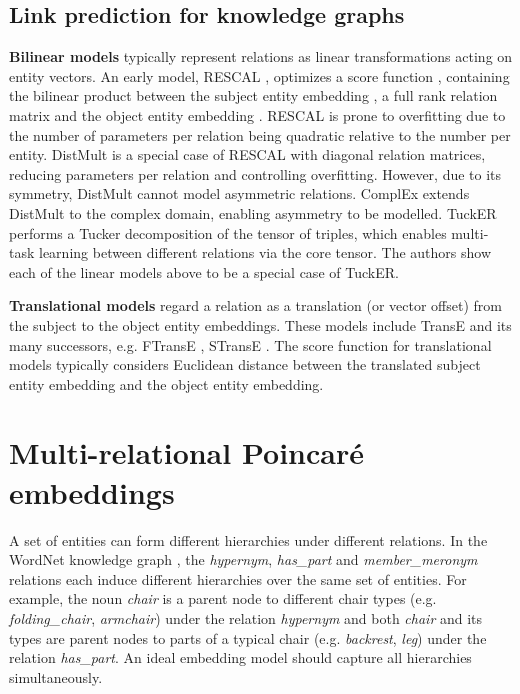 \documentclass{article}
\begin{document}
\subsection{Link prediction for knowledge graphs}


\textbf{Bilinear models} typically represent relations as linear transformations acting on entity vectors. An early model, RESCAL \cite{nickel2011three}, optimizes a score function , containing the bilinear product between the subject entity embedding , a full rank relation matrix  and the object entity embedding . RESCAL is prone to overfitting due to the number of parameters per relation being quadratic relative to the number per entity. 
DistMult \cite{yang2014embedding} is a special case of RESCAL with diagonal relation matrices, reducing parameters per relation and controlling overfitting. However, due to its symmetry, DistMult cannot model asymmetric relations. 
ComplEx \cite{trouillon2016complex} extends DistMult to the complex domain, enabling asymmetry to be modelled. 
TuckER \cite{balazevic2019tucker} performs a Tucker decomposition of the tensor of triples, which enables multi-task learning between different relations via the core tensor. The authors show each of the linear models above to be a special case of TuckER. 

\textbf{Translational models} regard a relation as a translation (or vector offset) from the subject to the object entity embeddings. These models include TransE \cite{bordes2013translating} and its many successors, e.g. FTransE \cite{feng2016knowledge}, STransE \cite{nguyen2016stranse}. The score function for translational models typically considers Euclidean distance between the translated subject entity embedding and the object entity embedding.


\section{Multi-relational Poincar{\'e} embeddings}\label{sec:murp}

A set of entities can form different hierarchies under different relations. In the WordNet knowledge graph \cite{miller1995wordnet}, the \textit{hypernym}, \textit{has\_part} and \textit{member\_meronym} relations each induce different hierarchies over the same set of entities. For example, the noun \textit{chair} is a parent node to different chair types (e.g. \textit{folding\_chair}, \textit{armchair}) under the relation \textit{hypernym} and both \textit{chair} and its types are parent nodes to parts of a typical chair (e.g. \textit{backrest}, \textit{leg}) under the relation \textit{has\_part}. An ideal embedding model should capture all hierarchies simultaneously. 
\end{document}
